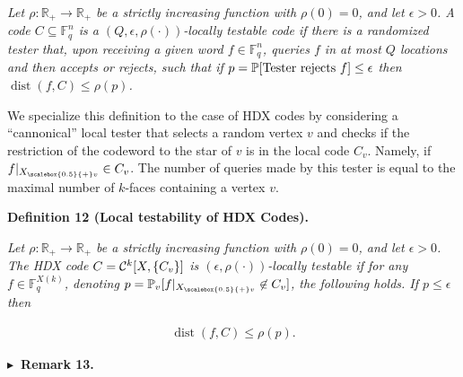\emph{Let $\rho:\mathbb{R}_{+}\to\mathbb{R}_{+}$ be a strictly increasing function with $\rho(0)=0$, and let $\epsilon>0$. A code $C\subseteq\mathbb{F}_{q}^{n}$ is a $(Q,\epsilon,\rho(\cdot))$-locally testable code if there is a randomized tester that, upon receiving a given word $f\in\mathbb{F}_{q}^{n}$, queries $f$ in at most $Q$ locations and then accepts or rejects, such that
if $p=\operatorname*{\mathbb{P}}[\hbox{Tester rejects }f]\leq\epsilon$ then $\operatorname{dist}(f,C)\leq\rho(p)$.}\par






We specialize this definition to the case of HDX codes by considering a “cannonical” local tester that selects a random vertex $v$ and checks if the restriction of the codeword to the star of $v$ is in the local code $C_{v}$. Namely, if $f|_{{X}_{\scalebox{0.5}{+}v}}\in C_{v}$. The number of queries made by this tester is equal to the maximal number of $k$-faces containing a vertex $v$.\par





\par\medskip\noindent\textbf{
\textbf{Definition 12}\textbf{ }(Local testability of HDX Codes)\textbf{.}
}\par



\emph{Let $\rho:\mathbb{R}_{+}\to\mathbb{R}_{+}$ be a strictly increasing function with $\rho(0)=0$, and let $\epsilon>0$.
The HDX code $C={\cal C}^{k}[X,\{C_{v}\}]$ is
$(\epsilon,\rho(\cdot))$-locally testable if for any $f\in\mathbb{F}_{q}^{X(k)}$, denoting $p=\operatorname*{\mathbb{P}}_{v}[f|_{{X}_{\scalebox{0.5}{+}v}}\not\in C_{v}]$, the following holds. If $p\leq\epsilon$ then}\par


\[\begin{gathered}
\operatorname{dist}(f,C)\leq\rho(p).
\end{gathered}\]







\par\medskip\noindent\textbf{
$\blacktriangleright$ Remark 13.
}\par



